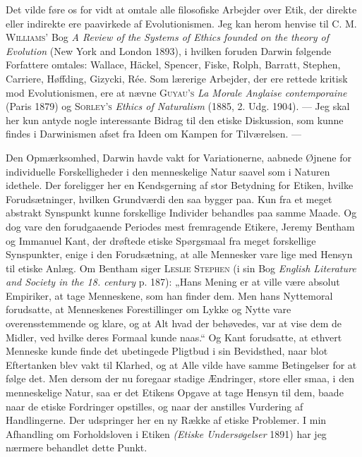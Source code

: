 \documentclass[12pt,a4paper,openany]{book}
\newcommand{\opage}[1]{\marginnote{\footnotesize\textit{[#1]}}}
\begin{document}
\setcounter{footnote}{0}%
\opage{223}Det vilde føre os for vidt at omtale alle filosofiske Arbejder
over Etik, der direkte eller indirekte ere paavirkede af
Evolutionismen. Jeg kan herom henvise til C. M. \textsc{Williams’}
Bog \textit{A Review of the Systems of Ethics founded on the
theory of Evolution} (New York and London 1893), i hvilken
foruden Darwin følgende Forfattere omtales: Wallace, Häckel,
Spencer, Fiske, Rolph, Barratt, Stephen, Carriere, Høffding,
Gizycki, Rée. Som lærerige Arbejder, der ere rettede kritisk
mod Evolutionismen, ere at nævne \textsc{Guyau’s} \textit{La Morale Anglaise
contemporaine} (Paris 1879) og \textsc{Sorley’s} \textit{Ethics of Naturalism}
(1885, 2. Udg. 1904). --- Jeg skal her kun antyde nogle interessante
Bidrag til den etiske Diskussion, som kunne findes i
Darwinismen afset fra Ideen om Kampen for Tilværelsen. ---

Den Opmærksomhed, Darwin havde vakt for Variationerne,
aabnede Øjnene for individuelle Forskelligheder i den menneskelige
Natur saavel som i Naturen idethele. Der foreligger
her en Kendsgerning af stor Betydning for Etiken, hvilke Forudsætninger,
hvilken Grundværdi den saa bygger paa. Kun
fra et meget abstrakt Synspunkt kunne forskellige Individer
behandles paa samme Maade. Og dog vare den forudgaaende
Periodes mest fremragende Etikere, Jeremy Bentham og Immanuel
Kant, der drøftede etiske Spørgsmaal fra meget forskellige
Synspunkter, enige i den Forudsætning, at alle Mennesker vare
lige med Hensyn til etiske Anlæg. Om Bentham siger \textsc{Leslie
Stephen} (i sin Bog \textit{English Literature and Society in the 18.
century} p. 187): „Hans Mening er at ville være absolut Empiriker,
at tage Menneskene, som han finder dem. Men hans
Nyttemoral forudsatte, at Menneskenes Forestillinger om Lykke
og Nytte vare overensstemmende og klare, og at Alt hvad der
behøvedes, var at vise dem de Midler, ved hvilke deres Formaal
kunde naas.“ Og Kant forudsatte, at ethvert Menneske
kunde finde det ubetingede Pligtbud i sin Bevidsthed, naar
blot Eftertanken blev vakt til Klarhed, og at Alle vilde have
samme Betingelser for at følge det. Men dersom der nu foregaar
stadige Ændringer, store eller smaa, i den menneskelige
Natur, saa er det Etikens Opgave at tage Hensyn til dem,
baade naar de etiske Fordringer opstilles, og naar der anstilles
\setcounter{footnote}{0}%
\opage{224}Vurdering af Handlingerne. Der udspringer her en ny Række
af etiske Problemer. I min Afhandling om Forholdsloven i
Etiken \textit{(Etiske Undersøgelser} 1891) har jeg nærmere behandlet
dette Punkt.
\end{document}
